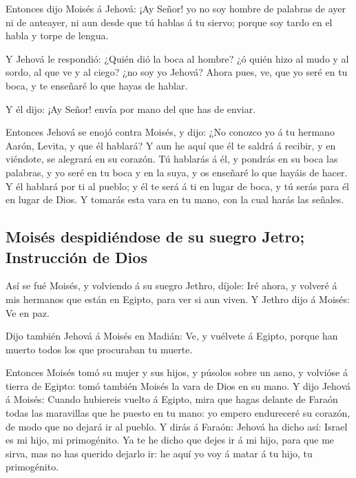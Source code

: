  Entonces dijo Moisés á Jehová: ¡Ay Señor! yo no soy
hombre de palabras de ayer ni de anteayer, ni aun desde que tú hablas á
tu siervo; porque soy tardo en el habla y torpe de lengua.

 Y Jehová le respondió: ¿Quién dió la boca al hombre? ¿ó
quién hizo al mudo y al sordo, al que ve y al ciego? ¿no soy yo Jehová?
 Ahora pues, ve, que yo seré en tu boca, y te enseñaré lo
que hayas de hablar.

 Y él dijo: ¡Ay Señor! envía por mano del que has de
enviar.

 Entonces Jehová se enojó contra Moisés, y dijo: ¿No
conozco yo á tu hermano Aarón, Levita, y que él hablará? Y aun he aquí
que él te saldrá á recibir, y en viéndote, se alegrará en su corazón.
 Tú hablarás á él, y pondrás en su boca las palabras, y
yo seré en tu boca y en la suya, y os enseñaré lo que hayáis de hacer.
 Y él hablará por ti al pueblo; y él te será á ti en
lugar de boca, y tú serás para él en lugar de Dios.  Y
tomarás esta vara en tu mano, con la cual harás las señales.

\hypertarget{moisuxe9s-despidiuxe9ndose-de-su-suegro-jetro-instrucciuxf3n-de-dios}{%
\subsection{Moisés despidiéndose de su suegro Jetro; Instrucción de
Dios}\label{moisuxe9s-despidiuxe9ndose-de-su-suegro-jetro-instrucciuxf3n-de-dios}}

 Así se fué Moisés, y volviendo á su suegro Jethro,
díjole: Iré ahora, y volveré á mis hermanos que están en Egipto, para
ver si aun viven. Y Jethro dijo á Moisés: Ve en paz.

 Dijo también Jehová á Moisés en Madián: Ve, y vuélvete á
Egipto, porque han muerto todos los que procuraban tu muerte.

 Entonces Moisés tomó su mujer y sus hijos, y púsolos
sobre un asno, y volvióse á tierra de Egipto: tomó también Moisés la
vara de Dios en su mano.  Y dijo Jehová á Moisés: Cuando
hubiereis vuelto á Egipto, mira que hagas delante de Faraón todas las
maravillas que he puesto en tu mano: yo empero endureceré su corazón, de
modo que no dejará ir al pueblo.  Y dirás á Faraón:
Jehová ha dicho así: Israel es mi hijo, mi primogénito. 
Ya te he dicho que dejes ir á mi hijo, para que me sirva, mas no has
querido dejarlo ir: he aquí yo voy á matar á tu hijo, tu primogénito.

